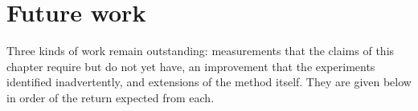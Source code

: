 %
%
%
%

\section{Future work}
\label{sec:future}

Three kinds of work remain outstanding: measurements that the claims of this
chapter require but do not yet have, an improvement that the experiments
identified inadvertently, and extensions of the method itself. They are given
below in order of the return expected from each.


